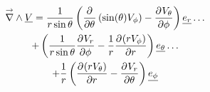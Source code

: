     \begin{multline}
        \vrot \v{V} = \frac{1}{r\sin\theta}\left(\ddr{\theta}{}\left(\sin(\theta)V_\phi\right) - \ddr{\phi}{V_\theta}\right)\v{e_r}\dots 
        \\
        + \left(\frac{1}{r\sin\theta}\ddr{\phi}{V_r} - \frac{1}{r}\ddr{r}{(rV_\phi)} \right)\v{e_\theta} \dots
        \\
        + \frac{1}{r}\left(\ddr{r}{(rV_\theta)}-\ddr{\theta}{V_r}\right)\v{e_\phi}
    \end{multline}